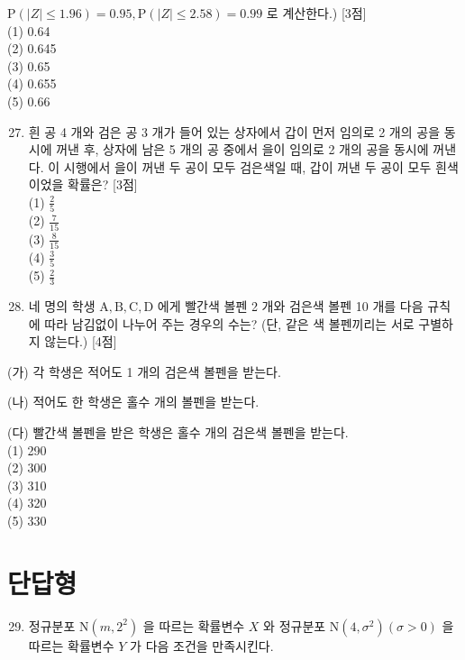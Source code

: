 \documentclass[10pt]{article}
\begin{document}
$\mathrm{P}(|Z| \leq 1.96)=0.95, \mathrm{P}(|Z| \leq 2.58)=0.99$ 로 계산한다.) [3점]\\
(1) 0.64\\
(2) 0.645\\
(3) 0.65\\
(4) 0.655\\
(5) 0.66

\begin{enumerate}
  \setcounter{enumi}{26}
  \item 흰 공 4 개와 검은 공 3 개가 들어 있는 상자에서 갑이 먼저 임의로 2 개의 공을 동시에 꺼낸 후, 상자에 남은 5 개의 공 중에서 을이 임의로 2 개의 공을 동시에 꺼낸다. 이 시행에서 을이 꺼낸 두 공이 모두 검은색일 때, 갑이 꺼낸 두 공이 모두 흰색이었을 확률은? [3점]\\
(1) $\frac{2}{5}$\\
(2) $\frac{7}{15}$\\
(3) $\frac{8}{15}$\\
(4) $\frac{3}{5}$\\
(5) $\frac{2}{3}$

  \item 네 명의 학생 $\mathrm{A}, \mathrm{B}, \mathrm{C}, \mathrm{D}$ 에게 빨간색 볼펜 2 개와 검은색 볼펜 10 개를 다음 규칙에 따라 남김없이 나누어 주는 경우의 수는? (단, 같은 색 볼펜끼리는 서로 구별하지 않는다.) [4점]

\end{enumerate}

(가) 각 학생은 적어도 1 개의 검은색 볼펜을 받는다.

(나) 적어도 한 학생은 홀수 개의 볼펜을 받는다.

(다) 빨간색 볼펜을 받은 학생은 홀수 개의 검은색 볼펜을 받는다.\\
(1) 290\\
(2) 300\\
(3) 310\\
(4) 320\\
(5) 330

\section*{단답형}
\begin{enumerate}
  \setcounter{enumi}{28}
  \item 정규분포 $\mathrm{N}\left(m, 2^{2}\right)$ 을 따르는 확률변수 $X$ 와 정규분포 $\mathrm{N}\left(4, \sigma^{2}\right)(\sigma>0)$ 을 따르는 확률변수 $Y$ 가 다음 조건을 만족시킨다.
\end{enumerate}
\end{document}
